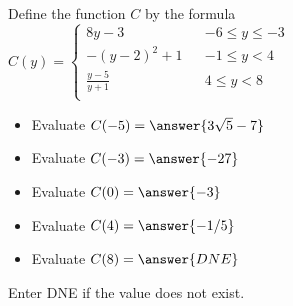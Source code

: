 \documentclass{ximera}
\begin{document}
\begin{definition}
Define the function $C$ by the formula $C(y) =   
\left \{ \begin{aligned}     
8 y - 3 && -6 \leq y \leq -3 \\        
-(y-2)^2 + 1 && -1 \leq y < 4 \\      
\frac{y-5}{y+1} && 4 \leq y < 8\\       
\end{aligned} \right .$ 
\end{definition}






\begin{exercise}
\begin{itemize}
\item Evaluate $C(-5) = \answer{3\sqrt{5}-7}$
\item Evaluate $C(-3) = \answer{-27}$
\item Evaluate $C(0) = \answer{-3}$
\item Evaluate $C(4) = \answer{-1/5}$
\item Evaluate $C(8) = \answer{DNE}$
\end{itemize}
Enter DNE if the value does not exist.
\end{exercise}
\end{document}
